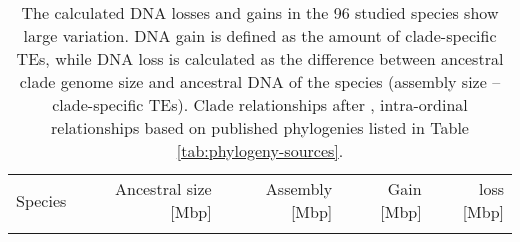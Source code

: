 \begin{center}
\begin{longtable}[t]{lrrrr}
\caption[DNA gain and loss]{The calculated DNA losses and gains in the 96 studied species show large
variation. DNA gain is defined as the amount of clade-specific TEs, while DNA loss is
calculated as the difference between ancestral clade genome size and ancestral DNA of
the species (assembly size – clade-specific TEs). Clade relationships after \citet{Misof2014},
intra-ordinal relationships based on published phylogenies listed in Table \ref{tab:phylogeny-sources}.}
\label{tab:gain-loss}

\footnotesize
\endfirsthead

\multicolumn{3}{c}{%
{\tablename\ \thetable{} --continued}} \\
\toprule
Species                    & Ancestral size {[}Mbp{]} & Assembly {[}Mbp{]} & Gain {[}Mbp{]} & loss {[}Mbp{]} \\
\midrule
\endhead

\bottomrule
\endfoot


\end{longtable}
\end{center}
